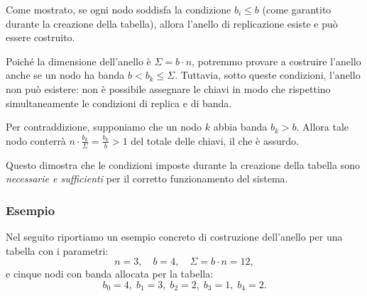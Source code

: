 Come mostrato, se ogni nodo soddisfa la condizione $b_i \leq b$ (come garantito durante la creazione della tabella), allora l'anello di replicazione esiste e può essere costruito.

Poiché la dimensione dell'anello è $\Sigma = b \cdot n$, potremmo provare a costruire l'anello anche se un nodo ha banda $b < b_k \leq \Sigma$.
Tuttavia, sotto queste condizioni, l'anello non può esistere: non è possibile assegnare le chiavi in modo che rispettino simultaneamente le condizioni di replica e di banda.

Per contraddizione, supponiamo che un nodo $k$ abbia banda $b_k > b$.
Allora tale nodo conterrà $\displaystyle n \cdot \frac{b_k}{\Sigma} = \frac{b_k}{b} > 1$ del totale delle chiavi, il che è assurdo.

Questo dimostra che le condizioni imposte durante la creazione della tabella sono \emph{necessarie e sufficienti} per il corretto funzionamento del sistema.

\subsubsection{Esempio}
\label{subsubsec:anello-esempio}

Nel seguito riportiamo un esempio concreto di costruzione dell'anello per una tabella con i parametri:
\[
    n = 3,\quad
    b = 4,\quad
    \Sigma = b \cdot n = 12,
\]
e cinque nodi con banda allocata per la tabella:
\[
    b_0 = 4,\; b_1 = 3,\; b_2 = 2,\; b_3 = 1,\; b_4 = 2.
\]

